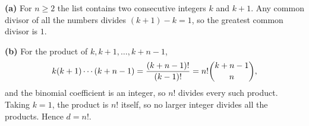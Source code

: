 \textbf{(a)} For $n\ge2$ the list contains two consecutive integers $k$ and $k+1$. Any common divisor of all the numbers divides $(k+1)-k=1$, so the greatest common divisor is $\boxed{1}$.

\textbf{(b)} For the product of $k,k+1,\dots,k+n-1$,
\[k(k+1)\cdots(k+n-1)=\dfrac{(k+n-1)!}{(k-1)!}=n!\dbinom{k+n-1}{n},\]
and the binomial coefficient is an integer, so $n!$ divides every such product. Taking $k=1$, the product is $n!$ itself, so no larger integer divides all the products. Hence $d=\boxed{n!}$.
